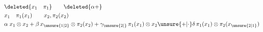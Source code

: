 \[
\begin{aligned}
&\deleted{x_1\quad\pi_1}\qquad\deleted{\alpha+}\\
&x_1\quad\pi_1(x_1)\qquad x_2,\pi_2(x_2)\\
&\alpha\; x_1\otimes x_2+\beta\,x_{\unsure{1|2}}\otimes\pi_2(x_{2})
+\gamma_{\unsure{2|{}}}\,\pi_1(x_1)\otimes x_2\unsure{+|\cdot}\delta\,\pi_1(x_1)\otimes\pi_2(x_{\unsure{2|1}})
\end{aligned}
\]
